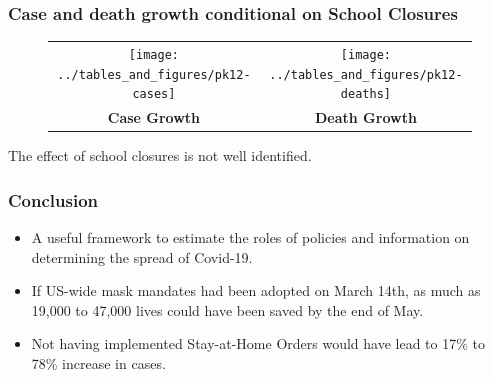 \documentclass{beamer}
\begin{document}
\begin{frame}
  \frametitle{Case and death growth conditional on \textbf{School Closures} }\vspace{-0.05cm}



\begin{figure}[ht]
  \begin{minipage}{\linewidth}
    \centering
    \begin{tabular}{cc}
       \texttt{[image: ../tables\_and\_figures/pk12-cases]}
      &
        \texttt{[image: ../tables\_and\_figures/pk12-deaths]}\\
    \textbf{Case Growth} &    \textbf{Death Growth} \\  
    \end{tabular}
  \end{minipage}
\end{figure}

The effect of school closures is not well identified. 


\end{frame}



\begin{frame}
  \frametitle{Conclusion }

\begin{itemize}
\item  A useful framework to estimate the roles of policies and information on determining the spread of Covid-19. \smallskip
 
\item  If US-wide mask mandates had been adopted on March 14th, as much as 19,000 to 47,000 lives could have been saved by the end of May.\smallskip

\item Not having implemented Stay-at-Home Orders would have lead to  17\% to 78\% increase in cases.\smallskip

%
%


\end{itemize}
 

\end{frame}
\end{document}
